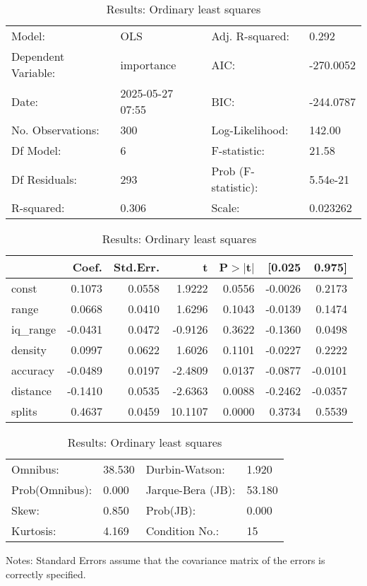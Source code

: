 \begin{table}
\caption{Results: Ordinary least squares}
\label{}
\begin{center}
\begin{tabular}{llll}
\hline
Model:              & OLS              & Adj. R-squared:     & 0.292      \\
Dependent Variable: & importance       & AIC:                & -270.0052  \\
Date:               & 2025-05-27 07:55 & BIC:                & -244.0787  \\
No. Observations:   & 300              & Log-Likelihood:     & 142.00     \\
Df Model:           & 6                & F-statistic:        & 21.58      \\
Df Residuals:       & 293              & Prob (F-statistic): & 5.54e-21   \\
R-squared:          & 0.306            & Scale:              & 0.023262   \\
\hline
\end{tabular}
\end{center}

\begin{center}
\begin{tabular}{lrrrrrr}
\hline
          &   Coef. & Std.Err. &       t & P$> |$t$|$ &  [0.025 &  0.975]  \\
\hline
const     &  0.1073 &   0.0558 &  1.9222 &      0.0556 & -0.0026 &  0.2173  \\
range     &  0.0668 &   0.0410 &  1.6296 &      0.1043 & -0.0139 &  0.1474  \\
iq\_range & -0.0431 &   0.0472 & -0.9126 &      0.3622 & -0.1360 &  0.0498  \\
density   &  0.0997 &   0.0622 &  1.6026 &      0.1101 & -0.0227 &  0.2222  \\
accuracy  & -0.0489 &   0.0197 & -2.4809 &      0.0137 & -0.0877 & -0.0101  \\
distance  & -0.1410 &   0.0535 & -2.6363 &      0.0088 & -0.2462 & -0.0357  \\
splits    &  0.4637 &   0.0459 & 10.1107 &      0.0000 &  0.3734 &  0.5539  \\
\hline
\end{tabular}
\end{center}

\begin{center}
\begin{tabular}{llll}
\hline
Omnibus:       & 38.530 & Durbin-Watson:    & 1.920   \\
Prob(Omnibus): & 0.000  & Jarque-Bera (JB): & 53.180  \\
Skew:          & 0.850  & Prob(JB):         & 0.000   \\
Kurtosis:      & 4.169  & Condition No.:    & 15      \\
\hline
\end{tabular}
\end{center}
\end{table}
\bigskip
Notes: \newline 
[1] Standard Errors assume that the covariance matrix of the errors is correctly specified.
